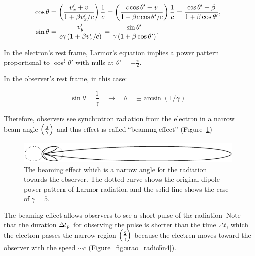 \begin{equation}\label{eq:essential_radio5n50}
    \begin{aligned}
        \cos \theta &= \left(\frac{v_x^{\prime}+v}{1+\beta v_x^{\prime} / c}\right) \frac{1}{c}=\left(\frac{c \cos \theta^{\prime}+v}{1+\beta c \cos \theta^{\prime} / c}\right) \frac{1}{c}=\frac{\cos \theta^{\prime}+\beta}{1+\beta \cos \theta^{\prime}}, \\
        \sin \theta &= \frac{v_y^{\prime}}{c \gamma\left(1+\beta v_{x}^{\prime} / c\right)} = \frac{\sin \theta^{\prime}}{\gamma\left(1+\beta \cos \theta^{\prime}\right)}.
    \end{aligned}
\end{equation}

In the electron's rest frame, Larmor's equation implies a power pattern proportional to $\cos^2\theta'$ with nulls at $\theta'=\pm \frac{\pi}{2}$.

In the observer's rest frame, in this case:

\begin{equation}\label{eq:essential_radio5n52}
    \sin\theta = \frac{1}{\gamma} \quad \rightarrow \quad \theta=\pm \arcsin (1 / \gamma)
\end{equation}

Therefore, observers see synchrotron radiation from the electron in a narrow beam angle $\left(\frac{2}{\gamma}\right)$ and this effect is called ``beaming effect'' (Figure~\ref{fig:nrao_radio5n3})

\begin{figure}[htbp]
	\centering
	\includegraphics[width=.7\linewidth]{Chapter_2/Figures/NRAO_radio5n3.png}
    \caption[The schematic picture of relativistic aberration]{\label{fig:nrao_radio5n3}
        The beaming effect which is a narrow angle for the radiation towards the observer.
        The dotted curve shows the original dipole power pattern of Larmor radiation and the solid line shows the case of $\gamma = 5$.
    }
\end{figure}

The beaming effect allows observers to see a short pulse of the radiation.
Note that the duration $\Delta t_{\mathrm{p}}$ for observing the pulse is shorter than the time $\Delta t$, which the electron passes the narrow region $\left(\frac{2}{\gamma}\right)$ because the electron moves toward the observer with the speed $\sim c$ (Figure~\ref{fig:nrao_radio5n4}).

